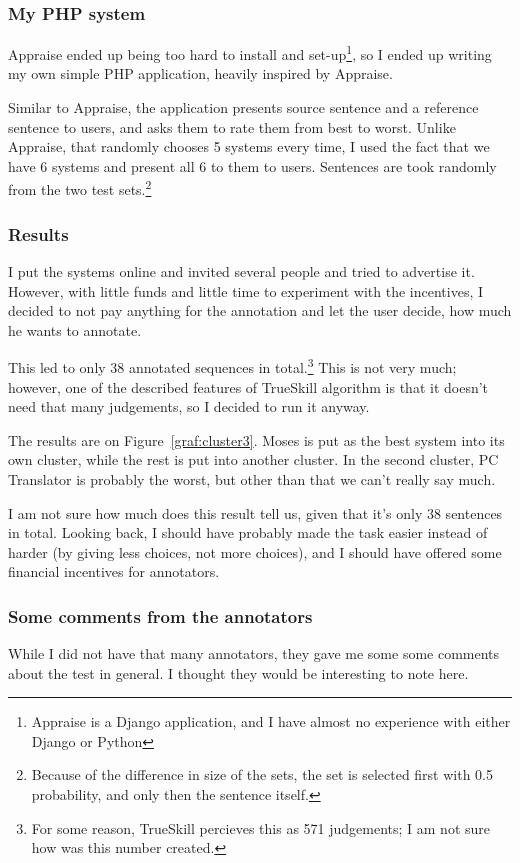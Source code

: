 \subsubsection{My PHP system}

Appraise ended up being too hard to install and set-up\footnote{Appraise is a Django application, and I have almost no experience with either Django or Python}, so I ended up writing my own simple PHP application, heavily inspired by Appraise. 

Similar to Appraise, the application presents source sentence and a reference sentence to users, and
asks them to rate them from best to worst.
Unlike Appraise, that randomly chooses 5 systems every time, I used the fact that we have 6 systems and present all 6 to them to users. Sentences are took randomly from the two test sets.\footnote{Because of the difference in size of the sets, the set is selected first with 0.5 probability, and only then the sentence itself.}


\subsubsection{Results}

I put the systems online and invited several people and tried to advertise it. However, with little funds and little time to experiment with the incentives, I decided to not pay anything for the annotation and let the user decide, how much he wants to annotate.

This led to only 38 annotated sequences in total.\footnote{For some reason, TrueSkill percieves this as 571 judgements; I am not sure how was this number created.} This is not very much; however, one of the described features of TrueSkill algorithm is that it doesn't need that many judgements, so I decided to run it anyway.

The results are on Figure~\ref{graf:cluster3}. Moses is put as the best system into its own cluster, while the rest is put into another cluster. In the second cluster, PC Translator is probably the worst, but other than that we can't really say much. 

I am not sure how much does this result tell us, given that it's only 38 sentences in total. Looking back, I should have probably made the task easier instead of harder (by giving less choices, not more choices), and I should have offered some financial incentives for annotators.

\subsubsection{Some comments from the annotators}
While I did not have that many annotators, they gave me some some comments about the test in general. I thought they would be interesting to note here.


